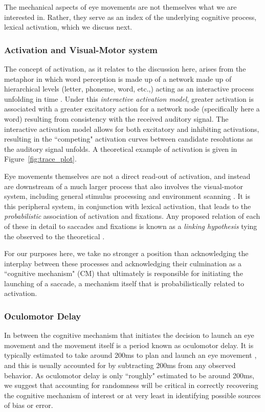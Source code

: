 The mechanical aspects of eye movements are not themselves what we are interested in. Rather, they serve as an index of the underlying cognitive process, lexical activation, which we discuss next.

\subsubsection{Activation and Visual-Motor system}

The concept of activation, as it relates to the discussion here, arises from the metaphor in which word perception is made up of a network made up of hierarchical levels (letter, phoneme, word, etc.,) acting as an interactive process unfolding in time \citep{McClelland1981}. Under this \textit{interactive activation model}, greater activation is associated with a greater excitatory action for a network node (specifically here a word) resulting from consistency with the received auditory signal. The interactive activation model allows for both excitatory and inhibiting activations, resulting in the ``competing" activation curves between candidate resolutions as the auditory signal unfolds. A theoretical example of activation is given in Figure~\ref{fig:trace_plot}.

Eye movements themselves are not a direct read-out of activation, and instead are downstream of a much larger process that also involves the visual-motor system, including general stimulus processing and environment scanning \citep{Salthouse1980}. It is this peripheral system, in conjunction with lexical activation, that leads to the \textit{probabilistic} association of activation and fixations. Any proposed relation of each of these in detail to saccades and fixations is known as a \textit{linking hypothesis} tying the observed to the theoretical \citep{Magnuson2019}. 

For our purposes here, we take no stronger a position than acknowledging the interplay between these processes and acknowledging their culmination as a ``cognitive mechanism" (CM) that ultimately is responsible for initiating the launching of a saccade, a mechanism itself that is probabilistically related to activation.



\subsubsection{Oculomotor Delay}

In between the cognitive mechanism that initiates the decision to launch an eye movement and the movement itself is a period known as oculomotor delay. It is typically estimated to take around 200ms to plan and launch an eye movement \citep{viviani1990time}, and this is usually accounted for by subtracting 200ms from any observed behavior. As oculomotor delay is only ``roughly" estimated to be around 200ms, we suggest that accounting for randomness will be critical in correctly recovering the cognitive mechanism of interest or at very least in identifying possible sources of bias or error. 





